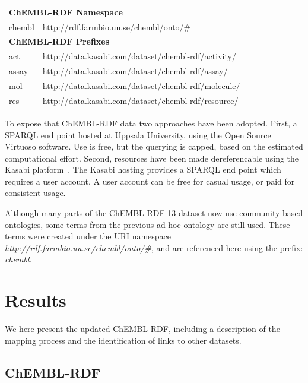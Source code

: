 \documentclass[10pt]{bmc_article}
\newenvironment{bmcformat}{\begin{raggedright}\baselineskip20pt\sloppy\setboolean{publ}{false}}{\end{raggedright}\baselineskip20pt\sloppy}
\begin{document}
\begin{bmcformat}
\begin{table}
\begin{center}
\begin{tabular}{ll}
\multicolumn{2}{l}{\textbf{ChEMBL-RDF Namespace}} \\
chembl & http://rdf.farmbio.uu.se/chembl/onto/\# \\

\multicolumn{2}{l}{\textbf{ChEMBL-RDF Prefixes }}\\
act    & http://data.kasabi.com/dataset/chembl-rdf/activity/ \\
assay  & http://data.kasabi.com/dataset/chembl-rdf/assay/ \\
mol    & http://data.kasabi.com/dataset/chembl-rdf/molecule/ \\
res    & http://data.kasabi.com/dataset/chembl-rdf/resource/ \\
\hline
\end{tabular}
\end{center}
\end{table}

To expose that ChEMBL-RDF data two approaches have been adopted. First, a SPARQL end point
hosted at Uppsala University, using the Open Source Virtuoso software. Use is free, but the
querying is capped, based on the estimated computational effort. Second, resources have
been made dereferencable using the Kasabi platform~\cite{kasabi}. The Kasabi hosting provides a SPARQL
end point which requires a user account. A user account can be free for casual usage, or paid for consistent usage.

Although many parts of the ChEMBL-RDF 13 dataset now use community based ontologies, some 
terms from the previous ad-hoc ontology are still used. These terms were created under the 
URI namespace \textit{http://rdf.farmbio.uu.se/chembl/onto/\#}, and are referenced here using the
prefix: \textit{chembl}.


\section*{Results}\label{s3}

We here present the updated ChEMBL-RDF, including a description of the mapping process 
and the identification of links to other datasets.

\subsection*{ChEMBL-RDF}


\end{bmcformat}
\end{document}
